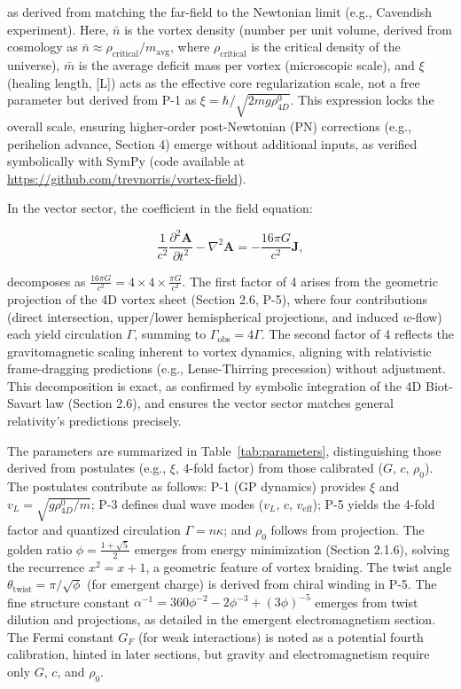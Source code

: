 
as derived from matching the far-field to the Newtonian limit (e.g., Cavendish experiment). Here, $\bar{n}$ is the vortex density (number per unit volume, derived from cosmology as $\bar{n} \approx \rho_{\text{critical}} / m_{\text{avg}}$, where $\rho_{\text{critical}}$ is the critical density of the universe), $\bar{m}$ is the average deficit mass per vortex (microscopic scale), and $\xi$ (healing length, [L]) acts as the effective core regularization scale, not a free parameter but derived from P-1 as $\xi = \hbar / \sqrt{2 m g \rho_{4D}^0}$. This expression locks the overall scale, ensuring higher-order post-Newtonian (PN) corrections (e.g., perihelion advance, Section 4) emerge without additional inputs, as verified symbolically with SymPy (code available at \url{https://github.com/trevnorris/vortex-field}).

In the vector sector, the coefficient in the field equation:

\[
\frac{1}{c^2} \frac{\partial^2 \mathbf{A}}{\partial t^2} - \nabla^2 \mathbf{A} = -\frac{16\pi G}{c^2} \mathbf{J},
\]

decomposes as $\frac{16\pi G}{c^2} = 4 \times 4 \times \frac{\pi G}{c^2}$. The first factor of 4 arises from the geometric projection of the 4D vortex sheet (Section 2.6, P-5), where four contributions (direct intersection, upper/lower hemispherical projections, and induced $w$-flow) each yield circulation $\Gamma$, summing to $\Gamma_{\text{obs}} = 4\Gamma$. The second factor of 4 reflects the gravitomagnetic scaling inherent to vortex dynamics, aligning with relativistic frame-dragging predictions (e.g., Lense-Thirring precession) without adjustment. This decomposition is exact, as confirmed by symbolic integration of the 4D Biot-Savart law (Section 2.6), and ensures the vector sector matches general relativity's predictions precisely.


The parameters are summarized in Table~\ref{tab:parameters}, distinguishing those derived from postulates (e.g., $\xi$, 4-fold factor) from those calibrated ($G$, $c$, $\rho_0$). The postulates contribute as follows: P-1 (GP dynamics) provides $\xi$ and $v_L = \sqrt{g \rho_{4D}^0 / m}$; P-3 defines dual wave modes ($v_L$, $c$, $v_{\text{eff}}$); P-5 yields the 4-fold factor and quantized circulation $\Gamma = n \kappa$; and $\rho_0$ follows from projection. The golden ratio $\phi = \frac{1 + \sqrt{5}}{2}$ emerges from energy minimization (Section 2.1.6), solving the recurrence $x^2 = x + 1$, a geometric feature of vortex braiding. The twist angle $\theta_{\text{twist}} = \pi / \sqrt{\phi}$ (for emergent charge) is derived from chiral winding in P-5. The fine structure constant $\alpha^{-1} = 360 \phi^{-2} - 2 \phi^{-3} + (3 \phi)^{-5}$ emerges from twist dilution and projections, as detailed in the emergent electromagnetism section. The Fermi constant $G_F$ (for weak interactions) is noted as a potential fourth calibration, hinted in later sections, but gravity and electromagnetism require only $G$, $c$, and $\rho_0$.


